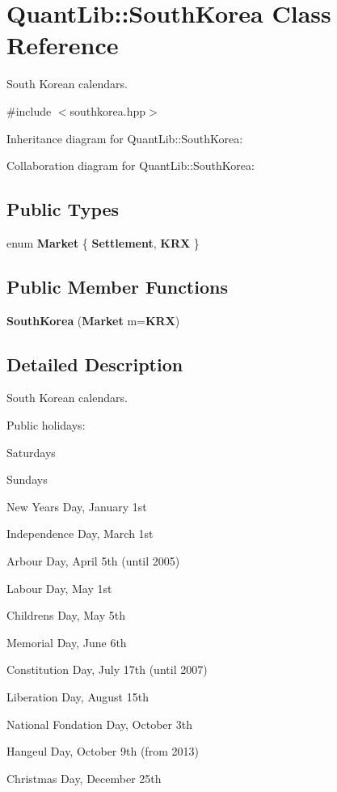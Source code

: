 \section{Quant\+Lib\+:\+:South\+Korea Class Reference}
\label{class_quant_lib_1_1_south_korea}


South Korean calendars.  




{\ttfamily \#include $<$southkorea.\+hpp$>$}



Inheritance diagram for Quant\+Lib\+:\+:South\+Korea\+:


Collaboration diagram for Quant\+Lib\+:\+:South\+Korea\+:
\subsection*{Public Types}
\begin{DoxyCompactItemize}
\item 
enum {\bf Market} \{ {\bf Settlement}, 
{\bf K\+RX}
 \}
\end{DoxyCompactItemize}
\subsection*{Public Member Functions}
\begin{DoxyCompactItemize}
\item 
{\bf South\+Korea} ({\bf Market} m={\bf K\+RX})
\end{DoxyCompactItemize}


\subsection{Detailed Description}
South Korean calendars. 

Public holidays\+: 
\begin{DoxyItemize}
\item Saturdays 
\item Sundays 
\item New Year\textquotesingle{}s Day, January 1st 
\item Independence Day, March 1st 
\item Arbour Day, April 5th (until 2005) 
\item Labour Day, May 1st 
\item Children\textquotesingle{}s Day, May 5th 
\item Memorial Day, June 6th 
\item Constitution Day, July 17th (until 2007) 
\item Liberation Day, August 15th 
\item National Fondation Day, October 3th 
\item Hangeul Day, October 9th (from 2013) 
\item Christmas Day, December 25th 
\end{DoxyItemize}

